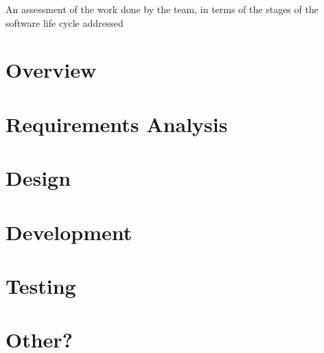 An assessment of the work done by the team, in terms of the stages of the software life cycle addressed

\section{Overview}

\section{Requirements Analysis}

\section{Design}

\section{Development}

\section{Testing}

\section{Other?}
